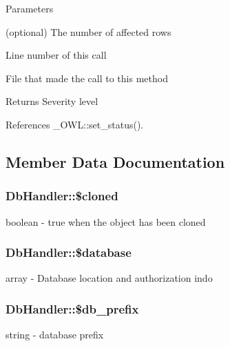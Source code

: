 \begin{DoxyParams}{Parameters}
\item[\mbox{\tt[out]} {\em \$rows}](optional) The number of affected rows \item[\mbox{\tt[in]} {\em \$line}]Line number of this call \item[\mbox{\tt[in]} {\em \$file}]File that made the call to this method \end{DoxyParams}
\begin{DoxyReturn}{Returns}
Severity level 
\end{DoxyReturn}


References \_\-OWL::set\_\-status().



\subsection{Member Data Documentation}
\subsubsection[{\$cloned}]{\setlength{\rightskip}{0pt plus 5cm}DbHandler::\$cloned}\label{classDbHandler_a6fc74f6785f349ab442f33ce31f46e63}
boolean -\/ true when the object has been cloned 
\subsubsection[{\$database}]{\setlength{\rightskip}{0pt plus 5cm}DbHandler::\$database}\label{classDbHandler_afaac5248f9ee59786b48a7b51f318940}
array -\/ Database location and authorization indo 
\subsubsection[{\$db\_\-prefix}]{\setlength{\rightskip}{0pt plus 5cm}DbHandler::\$db\_\-prefix}\label{classDbHandler_a19af96598e7f72673fc5da26ad77731b}
string -\/ database prefix 
